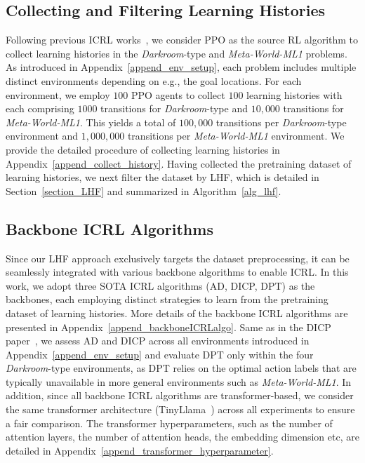\documentclass{article}
\begin{document}
\subsection{Collecting and Filtering Learning Histories}
\label{subsec_collect_filter_hist}
Following previous ICRL works~\cite{laskin2022context, son2025distilling}, we consider PPO as the source RL algorithm to collect learning histories in the \textit{Darkroom}-type and \textit{Meta-World-ML1} problems. As introduced in Appendix~\ref{append_env_setup}, each problem includes multiple distinct environments depending on e.g., the goal locations. For each environment, we employ $100$ PPO agents to collect $100$ learning histories with each comprising $1000$ transitions for \textit{Darkroom}-type and $10,000$ transitions for \textit{Meta-World-ML1}. This yields a total of $100,000$ transitions per \textit{Darkroom}-type environment and $1,000,000$ transitions per \textit{Meta-World-ML1} environment. We provide the detailed procedure of collecting learning histories in Appendix~\ref{append_collect_history}.
Having collected the pretraining dataset of learning histories, we next filter the dataset by LHF, which is detailed in Section~\ref{section_LHF} and summarized in Algorithm~\ref{alg_lhf}.
\subsection{Backbone ICRL Algorithms}
Since our LHF approach exclusively targets the dataset preprocessing, it can be seamlessly integrated with various backbone algorithms to enable ICRL.
In this work, we adopt three SOTA ICRL algorithms (AD, DICP, DPT) as the backbones, each employing distinct strategies to learn from the pretraining dataset of learning histories. More details of the backbone ICRL algorithms are presented in Appendix~\ref{append_backboneICRLalgo}.
Same as in the DICP paper~\cite{son2025distilling}, we assess AD and DICP across all environments introduced in Appendix~\ref{append_env_setup} and evaluate DPT only within the four \textit{Darkroom}-type environments, as DPT relies on the optimal action labels that are typically unavailable in more general environments such as \textit{Meta-World-ML1}.
In addition, since all backbone ICRL algorithms are transformer-based, we consider the same transformer architecture (TinyLlama~\cite{zhang2024tinyllama}) across all experiments to ensure a fair comparison. The transformer hyperparameters, such as the number of attention layers, the number of attention heads, the embedding dimension etc, are detailed in Appendix~\ref{append_transformer_hyperparameter}.
\end{document}
